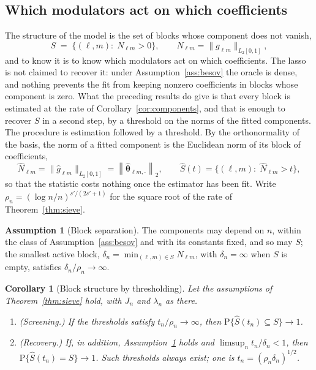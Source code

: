 \documentclass[12pt]{article} %
\newtheorem{corollary}{Corollary}
\theoremstyle{definition}
\newtheorem{assumption}{Assumption}
\newcommand{\Prob}{\mathrm{P}}
\newcommand{\norm}[1]{\left\lVert #1 \right\rVert}
\newcommand{\cv}{\ell}
\newcommand{\md}{m}
\newcommand{\gcomp}[2]{g_{#1#2}}
\newcommand{\btheta}{\boldsymbol{\theta}}
\newcommand{\thetahat}{\widehat{\btheta}}
\newcommand{\penn}{\lambda_{n}}
\newcommand{\seff}{s'}
\begin{document}
{\color{colR1}
\subsection{Which modulators act on which coefficients}
\label{sec:selection}

The structure of the model is the set of blocks whose component does not
vanish,
\[
  S \;=\; \bigl\{(\cv,\md) :\; N_{\cv\md} > 0\bigr\},
  \qquad
  N_{\cv\md} = \bigl\lVert \gcomp{\cv}{\md} \bigr\rVert_{L_2[0,1]},
\]
and to know it is to know which modulators act on which coefficients. The
lasso is not claimed to recover it: under Assumption~\ref{ass:besov} the
oracle is dense, and nothing prevents the fit from keeping nonzero
coefficients in blocks whose component is zero. What the preceding results do give is that every block is
estimated at the rate of Corollary~\ref{cor:components}, and that is enough to
recover $S$ in a second step, by a threshold on the norms of the fitted
components. The procedure is estimation followed by a threshold. By the
orthonormality of the basis, the norm of a fitted component is the Euclidean
norm of its block of coefficients,
\[
  \widehat{N}_{\cv\md}
  = \bigl\lVert \widehat{g}_{\cv\md} \bigr\rVert_{L_2[0,1]}
  = \norm{\thetahat_{\cv\md,\cdot}}_{2},
  \qquad
  \widehat{S}(t) = \bigl\{(\cv,\md) :\; \widehat{N}_{\cv\md} > t\bigr\},
\]
so that the statistic costs nothing once the estimator has been fit. Write
$\rho_n = (\log n/n)^{\seff/(2\seff+1)}$ for the square root of the rate of
Theorem~\ref{thm:sieve}.

\begin{assumption}[Block separation]
\label{ass:sep}
The components may depend on $n$, within the class of
Assumption~\ref{ass:besov} and with its constants fixed, and so may $S$; the
smallest active block, $\delta_n = \min_{(\cv,\md)\in S} N_{\cv\md}$, with
$\delta_n = \infty$ when $S$ is empty, satisfies $\delta_n/\rho_n \to \infty$.
\end{assumption}

\begin{corollary}[Block structure by thresholding]
\label{cor:threshold}
Let the assumptions of Theorem~\ref{thm:sieve} hold, with $J_n$ and $\penn$ as
there.
\begin{enumerate}
\item[(i)] (Screening.) If the thresholds satisfy $t_n/\rho_n \to \infty$,
then $\Prob\{\widehat{S}(t_n) \subseteq S\} \to 1$.
\item[(ii)] (Recovery.) If, in addition, Assumption~\ref{ass:sep} holds and
$\limsup_n t_n/\delta_n < 1$, then $\Prob\{\widehat{S}(t_n) = S\} \to 1$.
Such thresholds always exist; one is $t_n = (\rho_n\delta_n)^{1/2}$.
\end{enumerate}
\end{corollary}

}
\end{document}
